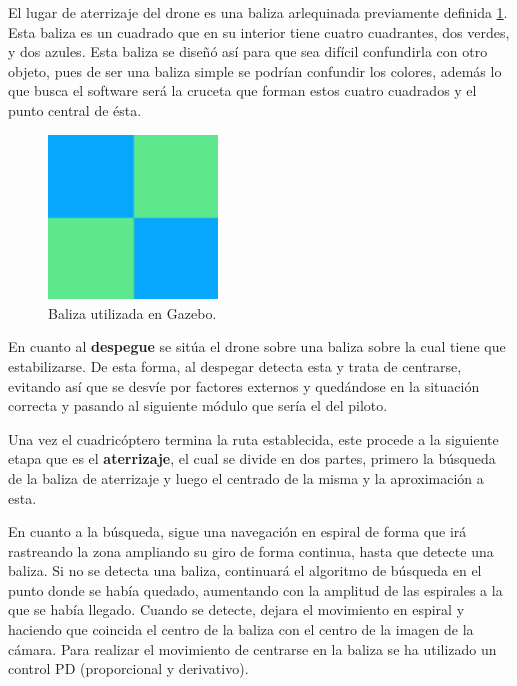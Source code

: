 \hspace{1cm} El lugar de aterrizaje del drone es una baliza arlequinada previamente definida \ref{fig:Baliza.}. Esta baliza es un cuadrado que en su interior tiene cuatro cuadrantes, dos verdes, y dos azules. Esta baliza se diseñó así para que sea difícil confundirla con otro objeto, pues de ser una baliza simple se podrían confundir los colores, además lo que busca el software será la cruceta que forman estos cuatro cuadrados y el punto central de ésta.

\begin{figure}[H]
	\begin{center}
		\includegraphics[width=0.4\textwidth]{imag/IMG33.png}
				\caption{Baliza utilizada en Gazebo.}
		\label{fig:Baliza.}	
	\end{center}
\end{figure}

\hspace{1cm} En cuanto al \textbf{despegue} se sitúa el drone sobre una baliza sobre la cual tiene que estabilizarse. De esta forma, al despegar detecta esta y trata de centrarse, evitando así que se desvíe por factores externos y quedándose en la situación correcta y pasando al siguiente módulo que sería el del piloto. 

\hspace{1cm} Una vez el cuadricóptero termina la ruta establecida, este procede a la siguiente etapa que es el \textbf{aterrizaje}, el cual se divide en dos partes, primero la búsqueda de la baliza de aterrizaje y luego el centrado de la misma y la aproximación a esta. 

\hspace{1cm} En cuanto a la búsqueda, sigue una navegación en espiral de forma que irá rastreando la zona ampliando su giro de forma continua, hasta que detecte una baliza. Si no se detecta una baliza, continuará el algoritmo de búsqueda en el punto donde se había quedado, aumentando con la amplitud de las espirales a la que se había llegado. Cuando se detecte, dejara el movimiento en espiral y haciendo que coincida el centro de la baliza con el centro de la imagen de la cámara.  Para realizar el movimiento de centrarse en la baliza se ha utilizado un control PD (proporcional y derivativo).  


